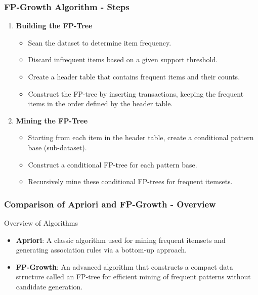 \documentclass[aspectratio=169]{beamer}
\begin{document}
\begin{frame}[fragile]
  \frametitle{FP-Growth Algorithm - Steps}
  \begin{enumerate}
    \item \textbf{Building the FP-Tree}
      \begin{itemize}
        \item Scan the dataset to determine item frequency.
        \item Discard infrequent items based on a given support threshold.
        \item Create a header table that contains frequent items and their counts.
        \item Construct the FP-tree by inserting transactions, keeping the frequent items in the order defined by the header table.
      \end{itemize}
    \item \textbf{Mining the FP-Tree}
      \begin{itemize}
        \item Starting from each item in the header table, create a conditional pattern base (sub-dataset).
        \item Construct a conditional FP-tree for each pattern base.
        \item Recursively mine these conditional FP-trees for frequent itemsets.
      \end{itemize}
  \end{enumerate}
\end{frame}

\begin{frame}[fragile]
    \frametitle{Comparison of Apriori and FP-Growth - Overview}
    \begin{block}{Overview of Algorithms}
        \begin{itemize}
            \item \textbf{Apriori}: A classic algorithm used for mining frequent itemsets and generating association rules via a bottom-up approach.
            \item \textbf{FP-Growth}: An advanced algorithm that constructs a compact data structure called an FP-tree for efficient mining of frequent patterns without candidate generation.
        \end{itemize}
    \end{block}
\end{frame}
\end{document}
